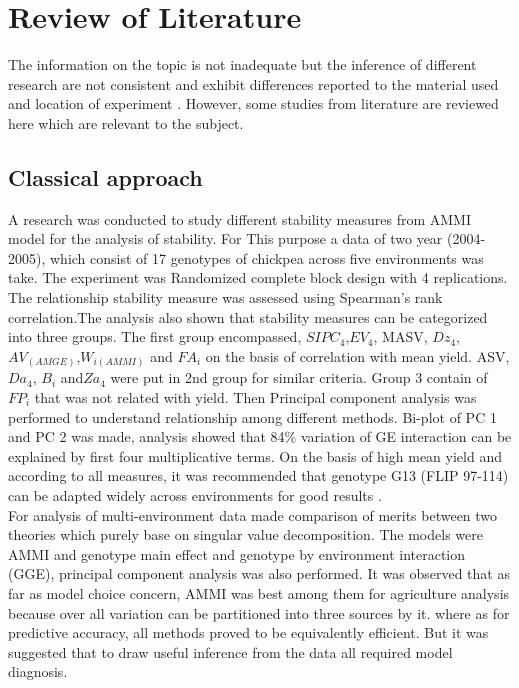 \chapter{Review of Literature}\label{review_chapter}
The information on the topic is not inadequate but the inference of different research are not consistent and exhibit  differences reported to the  material used and location of experiment . However, some studies from literature are reviewed here which are relevant to the subject.  

\section{Classical approach} 
A research was conducted to study  different stability measures from AMMI model for the analysis of stability. For This purpose a data of two year (2004-2005), which consist of 17 genotypes of chickpea  across five environments was take. The experiment was Randomized complete block design with 4 replications. The relationship stability measure was assessed using Spearman's rank correlation.The analysis also shown that stability measures can be categorized into three groups. The first group encompassed, $SIPC_4$,$ EV_4$, MASV, $Dz_4$,$ AV _{(AMGE)}$,$ W_{i(AMMI)}$ and $FA_i$ on the basis of correlation with mean yield. ASV, $Da_4$, $B_i$ and$ Za_4$ were put in 2nd group for similar criteria. Group 3 contain of $FP_i$ that was not related with yield. Then Principal component analysis was performed to understand relationship among different methods. Bi-plot of PC 1 and PC 2 was made, analysis showed that 84\% variation of GE interaction can be explained by first four multiplicative terms. On the basis of high mean  yield and according to all measures, it was recommended that genotype G13 (FLIP 97-114) can be adapted widely across environments for good results \citep{Zali2012}.\\ 
 
For analysis of multi-environment data \citep{Gauch2006} made comparison of merits between two theories which purely base on singular value decomposition. The models were AMMI and genotype main effect and genotype by environment interaction (GGE), principal component analysis was also performed. It was observed that as far as model choice concern, AMMI was best among them for agriculture analysis because over all variation can be partitioned into three sources by it. where as for predictive accuracy, all methods proved to be equivalently efficient. But it was suggested that to draw useful inference from the data all required model diagnosis. \\

